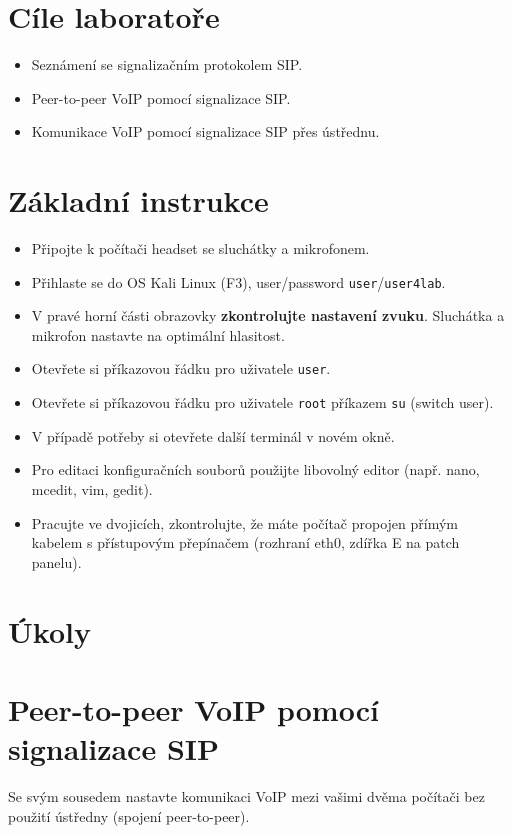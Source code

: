 
\section*{Cíle laboratoře}
\begin{itemize}
  \item Seznámení se signalizačním protokolem SIP.
  \item Peer-to-peer VoIP pomocí signalizace SIP.
  \item Komunikace VoIP pomocí signalizace SIP přes ústřednu.
\end{itemize}

\section*{Základní instrukce}
\begin{itemize}
  \item Připojte k počítači headset se sluchátky a mikrofonem.
  \item Přihlaste se do OS Kali Linux (F3), user/password {\tt user}/{\tt user4lab}.
  \item V pravé horní části obrazovky {\bf zkontrolujte nastavení zvuku}. Sluchátka a mikrofon nastavte na optimální hlasitost.
  \item Otevřete si příkazovou řádku pro uživatele {\tt user}.
  \item Otevřete si příkazovou řádku pro uživatele {\tt root} příkazem {\tt su}
  (switch user).
  \item V případě potřeby si otevřete další terminál v novém okně.
  \item Pro editaci konfiguračních souborů použijte libovolný editor (např.
  nano, mcedit, vim, gedit).
  \item Pracujte ve dvojicích, zkontrolujte, že máte počítač propojen
    přímým kabelem s přístupovým přepínačem (rozhraní eth0, zdířka E na patch
    panelu).


\end{itemize}

\section*{Úkoly}
\section{Peer-to-peer VoIP pomocí signalizace SIP}
Se svým sousedem nastavte komunikaci VoIP mezi vašimi dvěma počítači bez použití ústředny (spojení peer-to-peer).

